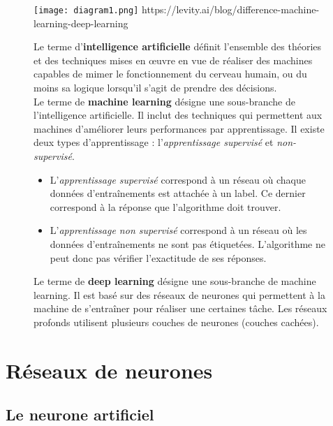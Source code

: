 \documentclass{article}
\begin{document}
\begin{figure}[H]
\begin{minipage}[c]{0.4\linewidth}

\centering
\texttt{[image: diagram1.png]}
https://levity.ai/blog/difference-machine-learning-deep-learning

\end{minipage} \hfill
\begin{minipage}[c]{0.6\linewidth}


Le terme d'\textbf{intelligence artificielle} définit l'ensemble des théories et des techniques 
mises en œuvre en vue de réaliser des machines capables de mimer le fonctionnement du cerveau humain, 
ou du moins sa logique lorsqu’il s’agit de prendre des décisions. \\

Le terme de \textbf{machine learning} désigne une sous-branche de l'intelligence artificielle.
Il inclut des techniques qui permettent aux machines d'améliorer leurs performances par apprentissage.
Il existe deux types d'apprentissage : l'\textit{apprentissage supervisé} et \textit{non-supervisé}.
\begin{itemize}
\item L'\textit{apprentissage supervisé} correspond à un réseau où chaque données d'entraînements est attachée à un label. 
Ce dernier correspond à la réponse que l'algorithme doit trouver. 
\item L'\textit{apprentissage non supervisé} correspond à un réseau où les données d'entraînements ne sont pas étiquetées.
L'algorithme ne peut donc pas vérifier l'exactitude de ses réponses.

\end{itemize}

Le terme de \textbf{deep learning} désigne une sous-branche de machine learning. 
Il est basé sur des réseaux de neurones qui permettent à la machine de 
s'entraîner pour réaliser une certaines tâche. Les réseaux profonds utilisent 
plusieurs couches de neurones (couches cachées). 

\end{minipage}
\end{figure}


\section{Réseaux de neurones}

\subsection{Le neurone artificiel}
\end{document}
